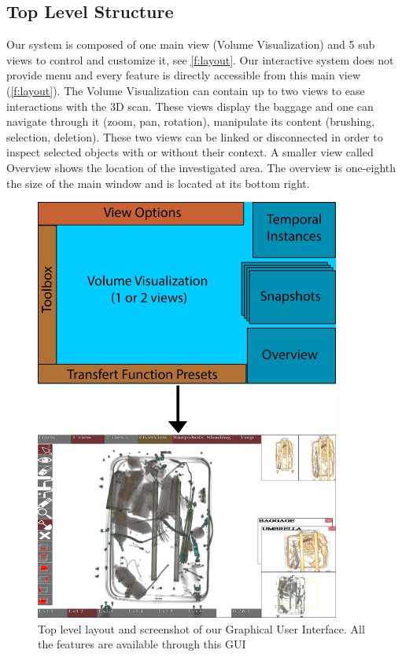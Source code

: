 \subsection{Top Level Structure}

Our system is composed of one main view (Volume Visualization) and 5 sub views to control and customize it, see  \autoref{f:layout}. Our interactive system does not provide menu and every feature is directly accessible from this main view (\autoref{f:layout}).
The Volume Visualization can contain up to two views to ease interactions with the 3D scan. These views display the baggage and one can navigate through it (zoom, pan, rotation), manipulate its content (brushing, selection, deletion). These two views can be linked or disconnected in order to inspect selected objects with or without their context.
A smaller view called Overview shows the location of the investigated area. The overview is one-eighth the size of the main window and is located at its bottom right.
\begin{figure}
\centering
	\includegraphics[height=14cm]{Figures/layout}
	\caption{Top level layout and screenshot of our Graphical User Interface. All the features are available through this GUI}
	\label{f:layout}
\end{figure}

